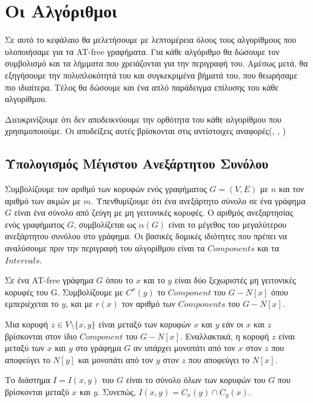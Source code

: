 \chapter{Οι Αλγόριθμοι}
\label{ch:Algorithms}

Σε αυτό το κεφάλαιο θα μελετήσουμε με λεπτομέρεια όλους τους αλγορίθμους που υλοποιήσαμε για τα AT-free γραφήματα.
Για κάθε αλγόριθμο θα δώσουμε τον συμβολισμό και τα λήμματα που χρειάζονται για την περιγραφή του. Αμέσως μετά, θα εξηγήσουμε την πολυπλοκότητά του και συγκεκριμένα βήματά του, που θεωρήσαμε πιο ιδιαίτερα. Τέλος θα δώσουμε και ένα απλό παράδειγμα επίλυσης του κάθε αλγορίθμου.

Διευκρινίζουμε ότι δεν αποδεικνύουμε την ορθότητα του κάθε αλγορίθμου που χρησιμοποιούμε. Οι αποδείξεις αυτές βρίσκονται στις αντίστοιχες αναφορές(\cite{at-free-independent-sets}, \cite{at-free-domination}, \cite{at-free-3-colouring})   

\section{Υπολογισμός Μέγιστου Ανεξάρτητου Συνόλου}
\label{sec:Independent_Set_Alg}
Συμβολίζουμε τον αριθμό των κορυφών ενός γραφήματος $G = (V, E)$ με
$n$ και τον αριθμό των ακμών με $m$. 
Υπενθυμίζουμε ότι ένα ανεξάρτητο σύνολο σε ένα γράφημα $G$ είναι ένα σύνολο από ζεύγη με μη γειτονικές
κορυφές. Ο αριθμός ανεξαρτησίας ενός γραφήματος $G$, συμβολίζεται ως $\alpha(G)$ είναι το μέγεθος
του μεγαλύτερου ανεξάρτητου συνόλου στο γράφημα. Οι βασικές δομικές ιδιότητες που πρέπει να αναλύσουμε πριν την περιγραφή του αλγορίθμου είναι τα $Components$ και τα $Intervals$.


Σε ένα AT-free γράφημα $G$ όπου το $x$ και το $y$ είναι δύο ξεχωριστές μη γειτονικές κορυφές του G. Συμβολίζουμε με $C^{x}(y)$ το $Component$ του $G - N[x]$ όπου εμπεριέχεται το $y$, και με $r(x)$ τον αριθμό των $Components$ του $G - N[x]$.

\begin{definition}
	Μια κορυφή $z \in V \setminus \{x, y\}$ είναι μεταξύ των κορυφών $x$ και $y$ εάν οι $x$ και $z$ βρίσκονται στον ίδιο $Component$ του $G - N[x]$. Εναλλακτικά, η κορυφή $z$ είναι μεταξύ των $x$ και $y$ στο γράφημα $G$ αν υπάρχει μονοπάτι από τον $x$ στον $z$ που αποφεύγει το $N[y]$ και μονοπάτι από τον $y$ στον $z$ που αποφεύγει το $N[x]$.
\end{definition}

\begin{definition}
	Το διάστημα $I = I(x, y)$ του $G$ είναι το σύνολο όλων των κορυφών του $G$ που βρίσκονται μεταξύ $x$ και $y$. Συνεπώς, $I(x, y) = C_x(y) \cap C_y(x)$.
\end{definition}

